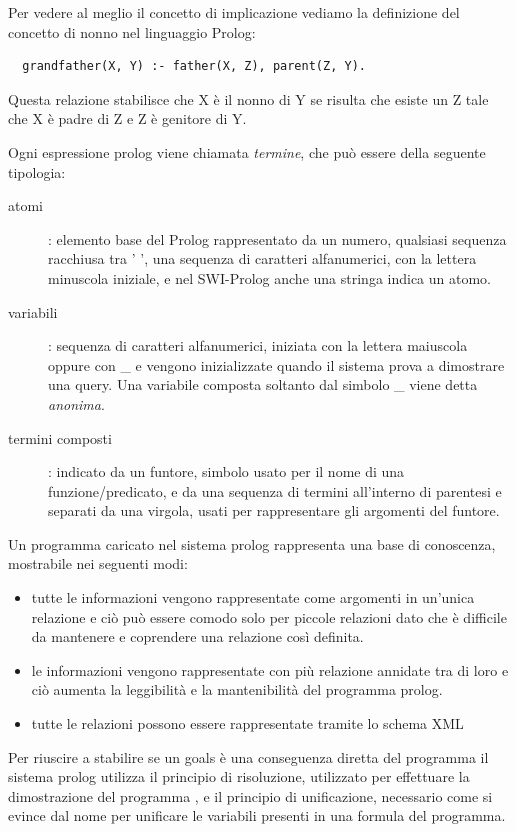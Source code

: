 \documentclass[a4paper]{book}
\begin{document}
Per vedere al meglio il concetto di implicazione vediamo la definizione del concetto di nonno nel linguaggio Prolog:
\begin{verbatim}
  grandfather(X, Y) :- father(X, Z), parent(Z, Y).
\end{verbatim}
Questa relazione stabilisce che X è il nonno di Y se risulta che esiste un Z tale che X è padre di Z e Z è genitore di Y.

Ogni espressione prolog viene chiamata \emph{termine}, che può essere della seguente tipologia:
\begin{description}
\item [atomi] : elemento base del Prolog rappresentato da un numero, qualsiasi sequenza racchiusa tra ' ',
       una sequenza di caratteri alfanumerici, con la lettera minuscola iniziale, e nel SWI-Prolog anche una stringa indica un atomo.

\item [variabili] : sequenza di caratteri alfanumerici, iniziata con la lettera maiuscola oppure con \_ e vengono inizializzate
                    quando il sistema prova a dimostrare una query.\newline
                    Una variabile composta soltanto dal simbolo \_ viene detta \emph{anonima}.

\item [termini composti]: indicato da un funtore, simbolo usato per il nome di una funzione/predicato, e da una sequenza
  di termini all'interno di parentesi e separati da una virgola, usati per rappresentare gli argomenti del funtore.
\end{description}

Un programma caricato nel sistema prolog rappresenta una base di conoscenza, mostrabile nei seguenti modi:
\begin{itemize}
\item tutte le informazioni vengono rappresentate come argomenti in un'unica relazione e ciò può essere comodo solo per
  piccole relazioni dato che è difficile da mantenere e coprendere una relazione così definita.
\item le informazioni vengono rappresentate con più relazione annidate tra di loro e ciò aumenta la leggibilità e
  la mantenibilità del programma prolog.
\item tutte le relazioni possono essere rappresentate tramite lo schema XML
\end{itemize}
Per riuscire a stabilire se un goals è una conseguenza diretta del programma il sistema prolog utilizza il principio di risoluzione,
utilizzato per effettuare la dimostrazione del programma , e il principio di unificazione, necessario come si evince dal nome per
unificare le variabili presenti in una formula del programma.
\end{document}
